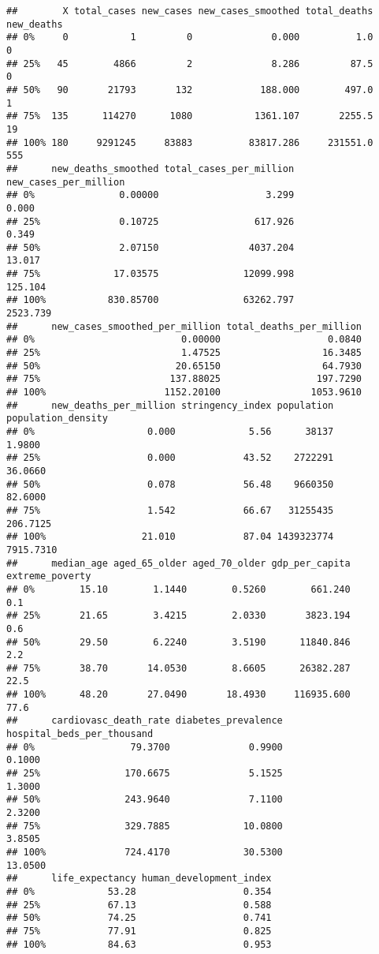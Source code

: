 \documentclass[]{article}
\begin{document}
\begin{verbatim}
##        X total_cases new_cases new_cases_smoothed total_deaths new_deaths
## 0%     0           1         0              0.000          1.0          0
## 25%   45        4866         2              8.286         87.5          0
## 50%   90       21793       132            188.000        497.0          1
## 75%  135      114270      1080           1361.107       2255.5         19
## 100% 180     9291245     83883          83817.286     231551.0        555
##      new_deaths_smoothed total_cases_per_million new_cases_per_million
## 0%               0.00000                   3.299                 0.000
## 25%              0.10725                 617.926                 0.349
## 50%              2.07150                4037.204                13.017
## 75%             17.03575               12099.998               125.104
## 100%           830.85700               63262.797              2523.739
##      new_cases_smoothed_per_million total_deaths_per_million
## 0%                          0.00000                   0.0840
## 25%                         1.47525                  16.3485
## 50%                        20.65150                  64.7930
## 75%                       137.88025                 197.7290
## 100%                     1152.20100                1053.9610
##      new_deaths_per_million stringency_index population population_density
## 0%                    0.000             5.56      38137             1.9800
## 25%                   0.000            43.52    2722291            36.0660
## 50%                   0.078            56.48    9660350            82.6000
## 75%                   1.542            66.67   31255435           206.7125
## 100%                 21.010            87.04 1439323774          7915.7310
##      median_age aged_65_older aged_70_older gdp_per_capita extreme_poverty
## 0%        15.10        1.1440        0.5260        661.240             0.1
## 25%       21.65        3.4215        2.0330       3823.194             0.6
## 50%       29.50        6.2240        3.5190      11840.846             2.2
## 75%       38.70       14.0530        8.6605      26382.287            22.5
## 100%      48.20       27.0490       18.4930     116935.600            77.6
##      cardiovasc_death_rate diabetes_prevalence hospital_beds_per_thousand
## 0%                 79.3700              0.9900                     0.1000
## 25%               170.6675              5.1525                     1.3000
## 50%               243.9640              7.1100                     2.3200
## 75%               329.7885             10.0800                     3.8505
## 100%              724.4170             30.5300                    13.0500
##      life_expectancy human_development_index
## 0%             53.28                   0.354
## 25%            67.13                   0.588
## 50%            74.25                   0.741
## 75%            77.91                   0.825
## 100%           84.63                   0.953
\end{verbatim}
\end{document}
